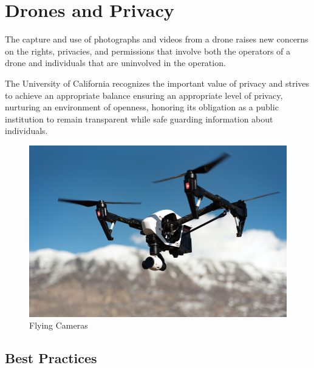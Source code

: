 \documentclass[
  12pt,
]{book}
\begin{document}
\hypertarget{ch-privacy}{%
\chapter{Drones and Privacy}\label{ch-privacy}}

The capture and use of photographs and videos from a drone raises new concerns on the rights, privacies, and permissions that involve both the operators of a drone and individuals that are uninvolved in the operation.

The University of California recognizes the important value of privacy and strives to achieve an appropriate balance ensuring an appropriate level of privacy, nurturing an environment of openness, honoring its obligation as a public institution to remain transparent while safe guarding information about individuals.

\begin{figure}

{\centering \includegraphics[width=0.75\linewidth]{images/inspire_1} 

}

\caption{Flying Cameras}\label{fig:drone1}
\end{figure}

\hypertarget{best-practices}{%
\section{Best Practices}\label{best-practices}}
\end{document}

